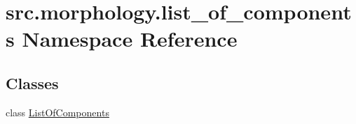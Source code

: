 \hypertarget{namespacesrc_1_1morphology_1_1list__of__components}{\section{src.\+morphology.\+list\+\_\+of\+\_\+components Namespace Reference}
\label{namespacesrc_1_1morphology_1_1list__of__components}
}
\subsection*{Classes}
\begin{DoxyCompactItemize}
\item 
class \hyperlink{classsrc_1_1morphology_1_1list__of__components_1_1_list_of_components}{List\+Of\+Components}
\end{DoxyCompactItemize}
